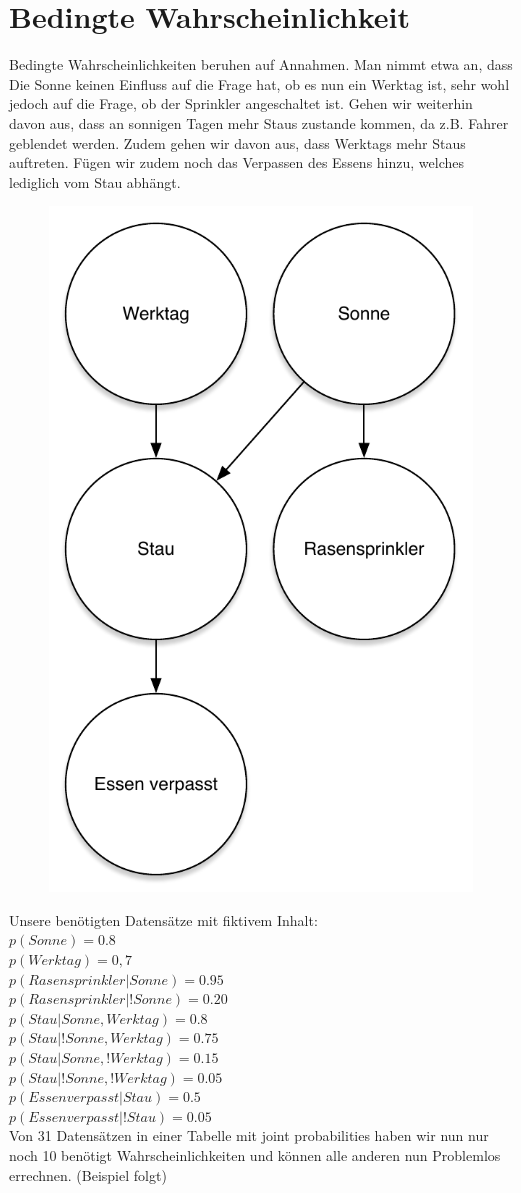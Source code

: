 \section{Bedingte Wahrscheinlichkeit}
Bedingte Wahrscheinlichkeiten beruhen auf Annahmen.
Man nimmt etwa an, dass Die Sonne keinen Einfluss auf die Frage hat, ob es nun ein Werktag ist, sehr wohl jedoch auf die Frage, ob der Sprinkler angeschaltet ist.
Gehen wir weiterhin davon aus, dass an sonnigen Tagen mehr Staus zustande kommen, da z.B. Fahrer geblendet werden.
Zudem gehen wir davon aus, dass Werktags mehr Staus auftreten.
Fügen wir zudem noch das Verpassen des Essens hinzu, welches lediglich vom Stau abhängt.

\begin{figure}[h]
    \centering
    \includegraphics[width=.2\textwidth]{chapters/bayes/bayes_example.pdf}
\end{figure}

Unsere benötigten Datensätze mit fiktivem Inhalt:\\
$p(Sonne) = 0.8$\\
$p(Werktag)= 0,7$\\
$p(Rasensprinkler | Sonne) = 0.95$\\
$p(Rasensprinkler | !Sonne) = 0.20$\\
$p(Stau | Sonne,Werktag) = 0.8$\\
$p(Stau | !Sonne, Werktag) = 0.75$\\
$p(Stau | Sonne, !Werktag) = 0.15$\\
$p(Stau | !Sonne, !Werktag) = 0.05$\\
$p(Essen verpasst | Stau) = 0.5$\\
$p(Essen verpasst | !Stau) = 0.05$\\

Von 31 Datensätzen in einer Tabelle mit joint probabilities haben wir nun nur noch 10 benötigt Wahrscheinlichkeiten und können alle anderen nun Problemlos errechnen. (Beispiel folgt)

